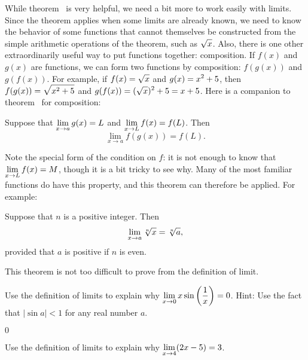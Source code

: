 While theorem~ is very helpful, we
need a bit more to work easily with limits. Since the theorem applies
when some limits are already known, we need to know the behavior of
some functions that cannot themselves be constructed from the simple
arithmetic operations of the theorem, such as $\displaystyle\sqrt{x}$. Also,
there is one other extraordinarily useful way to put functions
together: composition. If $f(x)$ and
$g(x)$ are functions, we can form two functions by composition:
$f(g(x))$ and $g(f(x))$. For example, if $\displaystyle f(x)=\sqrt{x}$ and $\displaystyle
\displaystyle g(x)=x^2+5$, then $\displaystyle f(g(x))=\sqrt{x^2+5}$ and $\displaystyle
g(f(x))=(\sqrt{x})^2+5=x+5$.  Here is a companion to
theorem~ for composition:

\begin{theorem} Suppose that $\displaystyle \lim_{x\to a}g(x)=L$ and $\displaystyle \lim_{x\to L}f(x)=f(L)$. Then
$$\lim_{x\to a} f(g(x)) = f(L).$$
\label{thm:limit of composition}
\end{theorem}

Note the special form of the condition on $f$: it is not enough to
know that $\displaystyle\lim_{x\to L}f(x) = M$, though it is a bit tricky to see
why. Many of the most familiar functions do have this property, and
this theorem can therefore be applied. For example:

\begin{theorem} Suppose that $n$ is a positive integer. Then
$$\lim_{x\to a}\root n\of{x} = \root n\of{a},$$
provided that $a$ is positive if $n$ is even.
\label{thm:continuity of roots}
\end{theorem}

This theorem is not too difficult to prove from the definition of limit.








\begin{exercises}


\begin{exercise} Use the definition of limits to explain why $\displaystyle\lim _{x\to 0 } x\sin \left( {1\over x}\right) = 0$.
Hint: Use the fact that $|\sin a |< 1 $ for any real number $a$.
\begin{answer} $0$
\end{answer}\end{exercise}

\begin{exercise} Use the definition of limits to explain why
$\displaystyle \lim_{x\to 4} (2x-5) = 3$.
\end{exercise}
\end{exercises}


